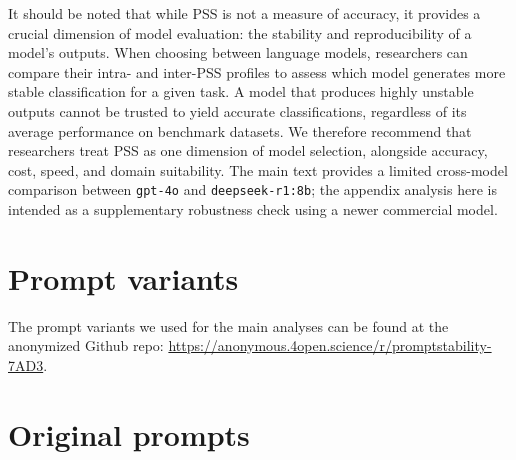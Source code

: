 It should be noted that while PSS is not a measure of accuracy, it provides a crucial dimension of model evaluation: the stability and reproducibility of a model's outputs. When choosing between language models, researchers can compare their intra- and inter-PSS profiles to assess which model generates more stable classification for a given task. A model that produces highly unstable outputs cannot be trusted to yield accurate classifications, regardless of its average performance on benchmark datasets. We therefore recommend that researchers treat PSS as one dimension of model selection, alongside accuracy, cost, speed, and domain suitability. The main text provides a limited cross-model comparison between \texttt{gpt-4o} and \texttt{deepseek-r1:8b}; the appendix analysis here is intended as a supplementary robustness check using a newer commercial model.

\section{Prompt variants}

The prompt variants we used for the main analyses can be found at the anonymized Github repo: \url{https://anonymous.4open.science/r/promptstability-7AD3}.

\tiny
\clearpage
\section{Original prompts}


